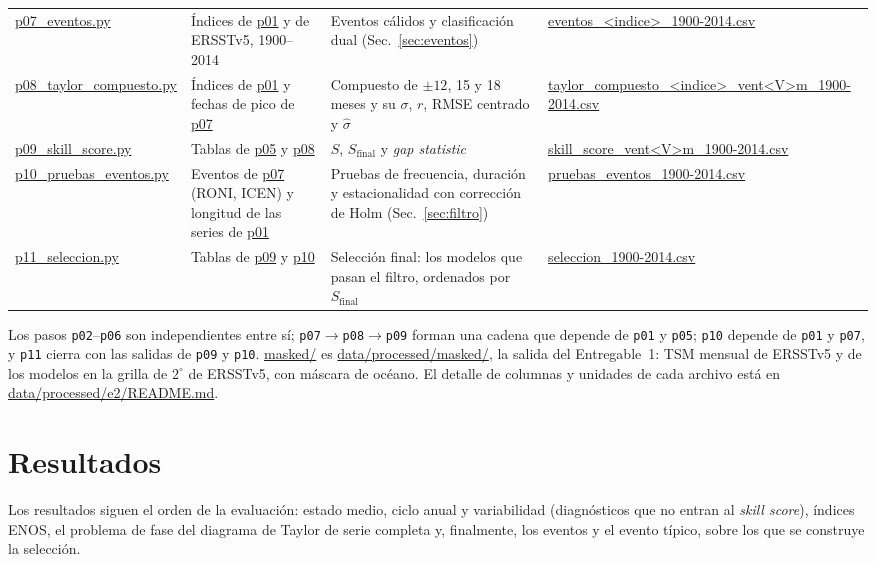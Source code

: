 \documentclass[11pt,a4paper]{article}
\newcommand{\archivo}[1]{\begingroup\hypersetup{urlcolor=black}\url{#1}\endgroup}
\begin{document}
\begin{table}[htbp]
\begin{tabular}{@{}L{2.9cm}L{3.9cm}L{\dimexpr\textwidth-2.9cm-3.9cm-3.9cm-6\tabcolsep\relax}L{3.9cm}@{}}
\archivo{p07_eventos.py} & Índices de \archivo{p01} y de ERSSTv5, 1900--2014 & Eventos cálidos y clasificación dual (Sec.~\ref{sec:eventos}) & \archivo{eventos_<indice>_1900-2014.csv} \\
\archivo{p08_taylor_compuesto.py} & Índices de \archivo{p01} y fechas de pico de \archivo{p07} & Compuesto de $\pm12$, 15 y 18 meses y su $\sigma$, $r$, RMSE centrado y $\hat\sigma$ & \archivo{taylor_compuesto_<indice>_vent<V>m_1900-2014.csv} \\
\archivo{p09_skill_score.py} & Tablas de \archivo{p05} y \archivo{p08} & $S$, $S_{\mathrm{final}}$ y \emph{gap statistic} & \archivo{skill_score_vent<V>m_1900-2014.csv} \\
\archivo{p10_pruebas_eventos.py} & Eventos de \archivo{p07} (RONI, ICEN) y longitud de las series de \archivo{p01} & Pruebas de frecuencia, duración y estacionalidad con corrección de Holm (Sec.~\ref{sec:filtro}) & \archivo{pruebas_eventos_1900-2014.csv} \\
\archivo{p11_seleccion.py} & Tablas de \archivo{p09} y \archivo{p10} & Selección final: los modelos que pasan el filtro, ordenados por $S_{\mathrm{final}}$ & \archivo{seleccion_1900-2014.csv} \\
\bottomrule
\end{tabular}
\end{table}

Los pasos \texttt{p02}--\texttt{p06} son independientes entre sí; \texttt{p07}$\to$\texttt{p08}$\to$\texttt{p09} forman una cadena que depende de \texttt{p01} y \texttt{p05}; \texttt{p10} depende de \texttt{p01} y \texttt{p07}, y \texttt{p11} cierra con las salidas de \texttt{p09} y \texttt{p10}. \archivo{masked/} es \archivo{data/processed/masked/}, la salida del Entregable~1: TSM mensual de ERSSTv5 y de los modelos en la grilla de $2^\circ$ de ERSSTv5, con máscara de océano. El detalle de columnas y unidades de cada archivo está en \archivo{data/processed/e2/README.md}.

\section{Resultados}
\label{sec:resultados}

Los resultados siguen el orden de la evaluación: estado medio, ciclo anual y variabilidad (diagnósticos que no entran al \emph{skill score}), índices ENOS, el problema de fase del diagrama de Taylor de serie completa y, finalmente, los eventos y el evento típico, sobre los que se construye la selección.
\end{document}
